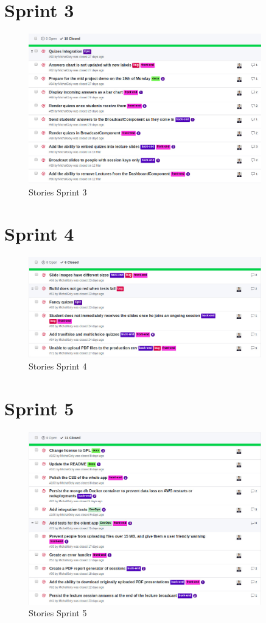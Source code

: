 \newpage
\section{Sprint 3}
\begin{figure}[ht]
    \centering
    \includegraphics[width=0.9\textwidth]{Appendix3/3.jpg}
    \caption{Stories Sprint 3}
    \label{fig:sprintstories3}
\end{figure}

\section{Sprint 4}
\begin{figure}[h!]
    \centering
    \includegraphics[width=0.9\textwidth]{Appendix3/4.jpg}
    \caption{Stories Sprint 4}
    \label{fig:sprintstories4}
\end{figure}

\newpage
\section{Sprint 5}
\begin{figure}[h!]
    \centering
    \includegraphics[width=0.9\textwidth]{Appendix3/5.jpg}
    \caption{Stories Sprint 5}
    \label{fig:sprintstories5}
\end{figure}
